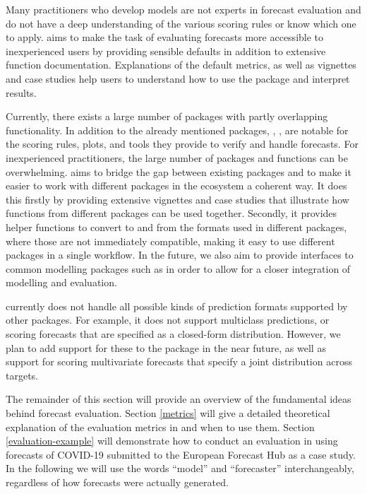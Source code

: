 \documentclass[
]{jss}
\begin{document}
Many practitioners who develop models are not experts in forecast
evaluation and do not have a deep understanding of the various scoring
rules or know which one to apply.  aims to make the
task of evaluating forecasts more accessible to inexperienced users by
providing sensible defaults in addition to extensive function
documentation. Explanations of the default metrics, as well as vignettes
and case studies help users to understand how to use the package and
interpret results.

Currently, there exists a large number of packages with partly
overlapping functionality. In addition to the already mentioned
packages,  \citep{surveillance}, 
\citep{predtools},  \citep{probably} are notable for the
scoring rules, plots, and tools they provide to verify and handle
forecasts. For inexperienced practitioners, the large number of packages
and functions can be overwhelming.  aims to bridge the
gap between existing packages and to make it easier to work with
different packages in the ecosystem a coherent way. It does this firstly
by providing extensive vignettes and case studies that illustrate how
functions from different packages can be used together. Secondly, it
provides helper functions to convert to and from the formats used in
different packages, where those are not immediately compatible, making
it easy to use different packages in a single workflow. In the future,
we also aim to provide interfaces to common modelling packages such as
 in order to allow for a closer integration of modelling and
evaluation.

 currently does not handle all possible kinds of
prediction formats supported by other packages. For example, it does not
support multiclass predictions, or scoring forecasts that are specified
as a closed-form distribution. However, we plan to add support for these
to the package in the near future, as well as support for scoring
multivariate forecasts that specify a joint distribution across targets.

The remainder of this section will provide an overview of the
fundamental ideas behind forecast evaluation. Section \ref{metrics} will
give a detailed theoretical explanation of the evaluation metrics in
 and when to use them. Section
\ref{evaluation-example} will demonstrate how to conduct an evaluation
in  using forecasts of COVID-19 submitted to the
European Forecast Hub
\citep{europeancovid-19forecasthubEuropeanCovid19Forecast2021} as a case
study. In the following we will use the words ``model'' and
``forecaster'' interchangeably, regardless of how forecasts were
actually generated.
\end{document}
